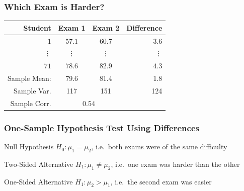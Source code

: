 \documentclass[handout]{beamer}
\begin{document}
\begin{frame}
\frametitle{Which Exam is Harder?}
%
\begin{table}[!tbp]
\begin{center}
\begin{tabular}{rccr}
\hline\hline
\multicolumn{1}{r}{Student}&\multicolumn{1}{c}{Exam 1}&\multicolumn{1}{c}{Exam 2}&\multicolumn{1}{r}{Difference}\tabularnewline
\hline
$ 1$&$57.1$&$60.7$&$  3.6$\tabularnewline
\vdots&\vdots&\vdots&\vdots\\
$71$&$78.6$&$82.9$&$  4.3$\tabularnewline
\hline
Sample Mean: & 79.6 & 81.4  &1.8\\
Sample Var. &117  & 151 & 124\\
Sample Corr.& \multicolumn{2}{c}{0.54}&\\
\hline
\end{tabular}
\end{center}
\end{table}

\vspace{1em}

\end{frame}
\begin{frame}
\frametitle{One-Sample Hypothesis Test Using Differences}
\small
{}
\vspace{0.1em}
\begin{block}{Null Hypothesis}
$H_0\colon \mu_1 = \mu_2$, i.e.\ both exams were of the same difficulty
\end{block}
\begin{block}{Two-Sided Alternative}
$H_1\colon \mu_1 \neq \mu_2$, i.e.\ one exam was harder than the other
\end{block}
\begin{block}{One-Sided Alternative}
$H_1\colon \mu_2 > \mu_1$, i.e.\ the second exam was easier
\end{block}
\end{frame}
\end{document}
